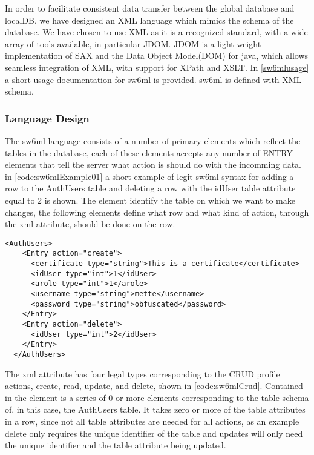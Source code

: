 In order to facilitate consistent data transfer between the global database and localDB, we have designed an XML language which mimics
the schema of the database. We have chosen to use XML as it is a recognized standard, with a wide array of tools available, in particular JDOM\cite{www.jdom.org}.
JDOM is a light weight implementation of SAX and the Data Object Model(DOM) for java, which allows seamless integration of XML, with support for XPath and XSLT.
In \autoref{sw6mlusage} a short usage documentation for sw6ml is provided. sw6ml is defined with XML schema.

\subsubsection{Language Design}

The sw6ml language consists of a number of primary elements which reflect the tables in the database, each of these elements accepts any number of ENTRY elements that tell
the server what action is should do with the incomming data.
in \autoref{code:sw6mlExample01} a short example of legit sw6ml syntax for adding a row to the AuthUsers table and deleting a row with the idUser table attribute equal to 2 is shown.
The  element identify the table on which we want to make changes, the following  elements
define what row and what kind of action, through the  xml attribute, should be done on the row. 

\begin{lstlisting}[label=code:sw6mlExample01,caption=Example of sw6ml syntax]
 <AuthUsers>
    <Entry action="create">
      <certificate type="string">This is a certificate</certificate>
      <idUser type="int">1</idUser>
      <arole type="int">1</arole>
      <username type="string">mette</username>
      <password type="string">obfuscated</password>
    </Entry>
    <Entry action="delete">
      <idUser type="int">2</idUser>
    </Entry>
  </AuthUsers>
\end{lstlisting}
The  xml attribute has four legal types corresponding to the CRUD profile actions, create, read, update, and delete, shown in \autoref{code:sw6mlCrud}.
Contained in the   element is a series of 0 or more elements corresponding to the table schema of, in this case, the AuthUsers table.
It takes zero or more of the table attributes in a row, since not all table attributes are needed for all actions, as an example delete only requires the unique identifier of the table and
updates will only need the unique identifier and the table attribute being updated.

